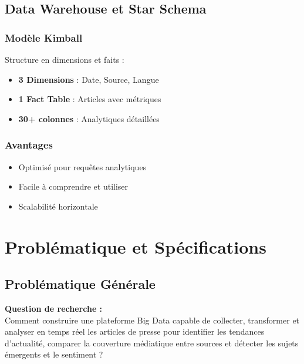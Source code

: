\documentclass[12pt,a4paper]{report}
\begin{document}
\section{Data Warehouse et Star Schema}

\subsection{Modèle Kimball}

Structure en dimensions et faits :

\begin{itemize}
    \item \textbf{3 Dimensions} : Date, Source, Langue
    \item \textbf{1 Fact Table} : Articles avec métriques
    \item \textbf{30+ colonnes} : Analytiques détaillées
\end{itemize}

\subsection{Avantages}

\begin{itemize}
    \item Optimisé pour requêtes analytiques
    \item Facile à comprendre et utiliser
    \item Scalabilité horizontale
\end{itemize}


\chapter{Problématique et Spécifications}

\section{Problématique Générale}

\begin{mdframed}[backgroundcolor=gray!10]
    \textbf{Question de recherche :}\\
    Comment construire une plateforme Big Data capable de collecter, transformer et analyser en temps réel les articles de presse pour identifier les tendances d'actualité, comparer la couverture médiatique entre sources et détecter les sujets émergents et le sentiment ?
\end{mdframed}
\end{document}
